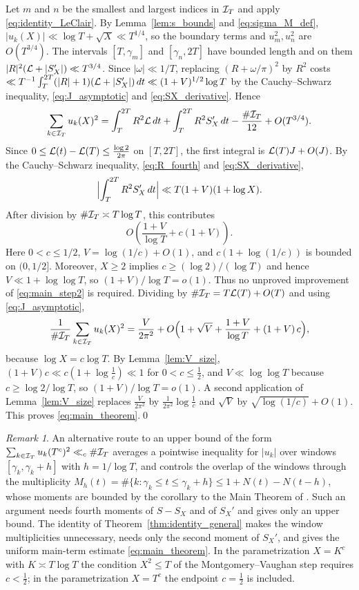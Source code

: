 \documentclass[11pt,reqno]{amsart}
\theoremstyle{plain}\newtheorem{theorem}{Theorem}[section]\newtheorem{proposition}[theorem]{Proposition}\newtheorem{lemma}[theorem]{Lemma}\newtheorem{corollary}[theorem]{Corollary}
\theoremstyle{definition}\newtheorem{hypothesis}[theorem]{Hypothesis}\newtheorem{definition}[theorem]{Definition}
\theoremstyle{remark}\newtheorem{remark}[theorem]{Remark}\newtheorem{experiment}[theorem]{Experiment}\newtheorem{question}[theorem]{Question}\newtheorem{heuristic}[theorem]{Heuristic}\newtheorem{conjecture}[theorem]{Conjecture}
\begin{document}
Let $m$ and $n$ be the smallest and largest indices in $\mathcal I_T$ and apply \eqref{eq:identity_LeClair}. By Lemma~\ref{lem:s_bounds} and \eqref{eq:sigma_M_def}, $|u_k(X)|\ll\log T+\sqrt X\ll T^{1/4}$, so the boundary terms and $u_m^2,u_n^2$ are $O(T^{3/4})$. The intervals $[T,\gamma_m]$ and $[\gamma_n,2T]$ have bounded length and on them $|R|^2(\mathcal L+|S_X'|)\ll T^{3/4}$. Since $|\omega|\ll1/T$, replacing $(R+\omega/\pi)^2$ by $R^2$ costs $\ll T^{-1}\int_T^{2T}(|R|+1)(\mathcal L+|S_X'|)\,dt\ll(1+V)^{1/2}\log T$ by the Cauchy--Schwarz inequality, \eqref{eq:J_asymptotic} and \eqref{eq:SX_derivative}. Hence
\begin{equation}
\sum_{k\in\mathcal I_T}u_k(X)^2=\int_T^{2T}R^2\mathcal L\,dt+\int_T^{2T}R^2S_X'\,dt-\frac{\#\mathcal I_T}{12}+O(T^{3/4}).
\label{eq:main_step1}
\end{equation}
Since $0\le\mathcal L(t)-\mathcal L(T)\le\frac{\log2}{2\pi}$ on $[T,2T]$, the first integral is $\mathcal L(T)J+O(J)$. By the Cauchy--Schwarz inequality, \eqref{eq:R_fourth} and \eqref{eq:SX_derivative},
\begin{equation}
\Bigl|\int_T^{2T}R^2S_X'\,dt\Bigr|\ll T(1+V)(1+\log X).
\label{eq:main_step2}
\end{equation}
After division by $\#\mathcal I_T\asymp T\log T$, this contributes
\[
 O\!\left(\frac{1+V}{\log T}+c(1+V)\right).
\]
Here $0<c\le1/2$, $V=\log(1/c)+O(1)$, and $c(1+\log(1/c))$ is bounded on $(0,1/2]$.  Moreover, $X\ge2$ implies $c\ge(\log2)/(\log T)$ and hence $V\ll1+\log\log T$, so $(1+V)/\log T=o(1)$.  Thus no unproved improvement of \eqref{eq:main_step2} is required.  Dividing by $\#\mathcal I_T=T\mathcal L(T)+O(T)$ and using \eqref{eq:J_asymptotic},
\begin{equation}
\frac1{\#\mathcal I_T}\sum_{k\in\mathcal I_T}u_k(X)^2=\frac V{2\pi^2}+O\Bigl(1+\sqrt V+\frac{1+V}{\log T}+(1+V)\,c\Bigr),
\label{eq:main_step3}
\end{equation}
because $\log X=c\log T$. By Lemma~\ref{lem:V_size}, $(1+V)c\ll c(1+\log\frac1c)\ll1$ for $0<c\le\frac12$, and $V\ll\log\log T$ because $c\ge\log2/\log T$, so $(1+V)/\log T=o(1)$. A second application of Lemma~\ref{lem:V_size} replaces $\frac V{2\pi^2}$ by $\frac1{2\pi^2}\log\frac1c$ and $\sqrt V$ by $\sqrt{\log(1/c)}+O(1)$. This proves \eqref{eq:main_theorem}.\qed

\begin{remark}\label{rem:alternative_route}
An alternative route to an upper bound of the form $\sum_{k\in\mathcal I_T}u_k(T^c)^2\ll_c\#\mathcal I_T$ averages a pointwise inequality for $|u_k|$ over windows $[\gamma_k,\gamma_k+h]$ with $h=1/\log T$, and controls the overlap of the windows through the multiplicity $M_h(t)=\#\{k:\gamma_k\le t\le\gamma_k+h\}\le1+N(t)-N(t-h)$, whose moments are bounded by the corollary to the Main Theorem of \cite{Fujii1974}. Such an argument needs fourth moments of $S-S_X$ and of $S_X'$ and gives only an upper bound. The identity of Theorem~\ref{thm:identity_general} makes the window multiplicities unnecessary, needs only the second moment of $S_X'$, and gives the uniform main-term estimate \eqref{eq:main_theorem}. In the parametrization $X=K^c$ with $K\asymp T\log T$ the condition $X^2\le T$ of the Montgomery--Vaughan step requires $c<\frac12$; in the parametrization $X=T^c$ the endpoint $c=\frac12$ is included.
\end{remark}
\end{document}
